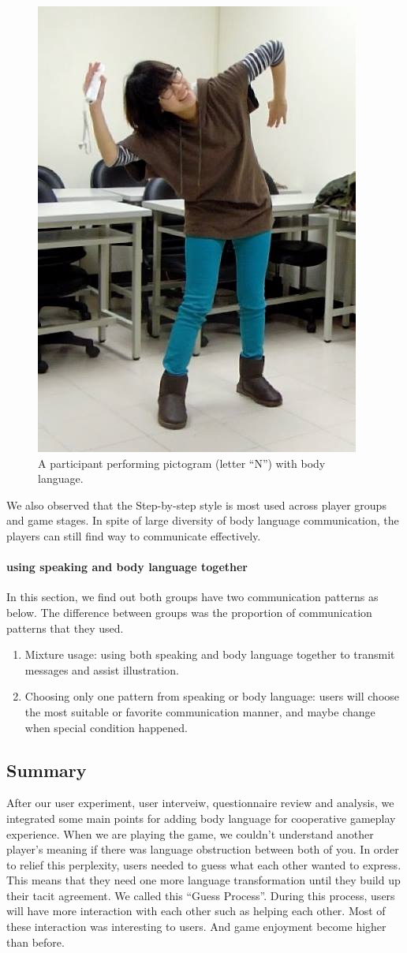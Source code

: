 \begin{figure}[!h]
\centering
\includegraphics[width=0.4\columnwidth]{Figures/US_F3.jpg}
\caption{A participant performing pictogram (letter “N”) with body language.}
\label{fig:US_F3}
\end{figure}

We also observed that the Step-by-step style is most used across player groups and game stages. In spite of large diversity of body language communication, the players can still find way to communicate effectively.

\paragraph{using speaking and body language together}
In this section, we find out both groups have two communication patterns as below. The difference between groups was the proportion of communication patterns that they used.

\begin{enumerate}
  \item Mixture usage: using both speaking and body language together to transmit messages and assist illustration.

  \item Choosing only one pattern from speaking or body language: users will choose the most suitable or favorite communication manner, and maybe change when special condition happened.
\end{enumerate}


\subsection{Summary}
After our user experiment, user interveiw, questionnaire review and analysis, we integrated some main points for adding body language for cooperative gameplay experience. When we are playing the game, we couldn't understand another player's meaning if there was language obstruction between both of you. In order to relief this perplexity, users needed to guess what each other wanted to express. This means that they need one more language transformation until they build up their tacit agreement. We called this ``Guess Process''. During this process, users will have more interaction with each other such as helping each other. Most of these interaction was interesting to users. And 
game enjoyment become higher than before.

